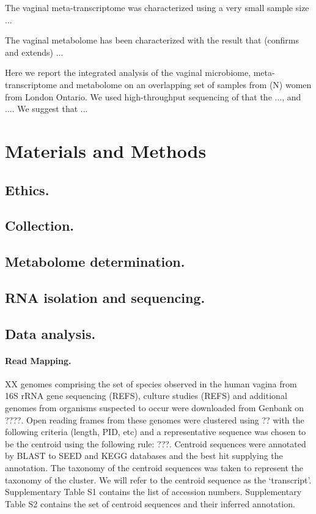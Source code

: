 \documentclass[10pt,letterpaper]{article}
\begin{document}
The vaginal meta-transcriptome was characterized using a very small sample size ...

The vaginal metabolome has been characterized with the result that (confirms and extends) ...



Here we report the integrated analysis of the vaginal microbiome, meta-transcriptome and metabolome on an overlapping set of samples from (N) women from London Ontario. We used  high-throughput sequencing of that the ..., and .... We suggest that ...


\section*{Materials and Methods}
\subsection*{Ethics.}
\subsection*{Collection.}
\subsection*{Metabolome determination.}
\subsection*{RNA isolation and sequencing.}
\subsection*{Data analysis.} 

\paragraph{Read Mapping.} XX genomes comprising the set of species observed in the human vagina from 16S rRNA gene sequencing (REFS), culture studies (REFS) and additional genomes from organisms suspected to occur were downloaded from Genbank on ????. Open reading frames from these genomes were clustered using ?? with the following criteria (length, PID, etc) and a representative sequence was chosen to be the centroid using the following rule: ???. Centroid sequences were annotated by BLAST to SEED and KEGG databases and the best hit supplying the annotation. The taxonomy of the centroid sequences was taken to represent the taxonomy of the cluster. We will refer to the centroid sequence as the `transcript'. Supplementary Table S1 contains the list of accession numbers. Supplementary Table S2 contains the set of centroid sequences and their inferred annotation. 
\end{document}
